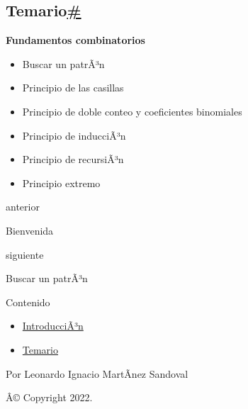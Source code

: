 \documentclass[
]{article}
\providecommand{\tightlist}{%
  \setlength{\itemsep}{0pt}\setlength{\parskip}{0pt}}
\begin{document}
\subsection{\texorpdfstring{Temario\hyperref[temario]{\#}}{Temario\#}}\label{temario}

\textbf{Fundamentos combinatorios}

\begin{itemize}
\item
  Buscar un patrÃ³n
\item
  Principio de las casillas
\item
  Principio de doble conteo y coeficientes binomiales
\item
  Principio de inducciÃ³n
\item
  Principio de recursiÃ³n
\item
  Principio extremo
\end{itemize}

\href{../intro.html}{\emph{}}

anterior

Bienvenida

\href{BuscarPatron.html}{}

siguiente

Buscar un patrÃ³n

\emph{}

\emph{} Contenido

\begin{itemize}
\tightlist
\item
  \hyperref[introduccion]{IntroducciÃ³n}
\item
  \hyperref[temario]{Temario}
\end{itemize}

Por Leonardo Ignacio MartÃ­nez Sandoval

Â© Copyright 2022.\\
\end{document}

